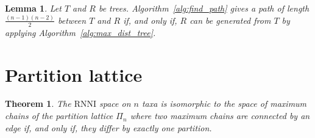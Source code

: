 \documentclass[11pt, a4paper]{article}
\newcommand{\rnni}{\mathrm{RNNI}}
\newtheorem{theorem}[definition]{Theorem}
\newtheorem{lemma}[definition]{Lemma}
\begin{document}
\begin{lemma}
    Let $T$ and $R$ be trees.
    Algorithm~\ref{alg:find_path} gives a path of length $\frac{(n-1)(n-2)}{2}$ between $T$ and $R$ if, and only if, $R$ can be generated from $T$ by applying Algorithm~\ref{alg:max_dist_tree}.
\end{lemma}



\section{Partition lattice}


\begin{theorem}
	The $\rnni$ space on $n$ taxa is isomorphic to the space of maximum chains of the partition lattice $\Pi_n$ where two maximum chains are connected by an edge if, and only if, they differ by exactly one partition.
\end{theorem}



\end{document}
